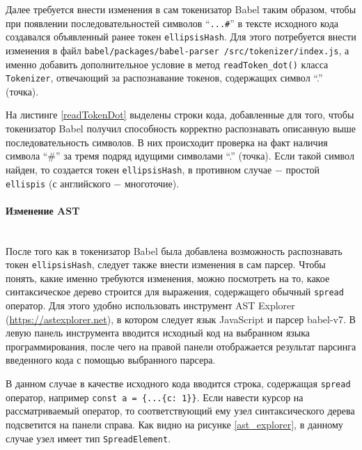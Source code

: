 \documentclass[14pt, a4paper]{article}
\def\code#1{\texttt{#1}} %
\begin{document}


Далее требуется внести изменения в сам токенизатор Babel таким образом, чтобы при появлении последовательностей символов 
``\code{...\#}'' в тексте исходного кода создавался объявленный ранее токен \code{ellipsisHash}. Для этого 
потребуется внести изменения в файл \code{babel/packages/babel-parser
/src/tokenizer/index.js}, а именно добавить дополнительное условие в метод \code{readToken\_dot()} класса \code{Tokenizer}, отвечающий за распознавание токенов,
содержащих символ ``.'' (точка).


На листинге \ref{readTokenDot} выделены строки кода, добавленные для того, чтобы токенизатор Babel 
получил способность корректно распознавать описанную выше последовательность символов. В них происходит 
проверка на факт наличия символа ``\#'' за тремя подряд идущими символами ``.'' (точка).
Если такой символ найден, то создается токен \code{ellipsisHash}, в противном случае
$-$ простой \code{ellispis} (с английского $-$ многоточие).

\paragraph{Изменение AST} \mbox{}\\

После того как в токенизатор Babel была добавлена возможность распознавать токен \code{ellipsisHash},
следует также внести изменения в сам парсер. Чтобы понять, какие именно требуются изменения, можно посмотреть на то, какое
синтаксическое дерево строится для выражения, содержащего обычный \code{spread} оператор. Для этого удобно использовать 
инструмент AST Explorer (\url{https://astexplorer.net}), в котором следует язык JavaScript и парсер babel-v7.
В левую панель инструмента вводится исходный код на выбранном языка программирования, после чего на 
правой панели отображается результат парсинга введенного кода с помощью выбранного парсера.

В данном случае в качестве исходного кода вводится строка, содержащая \code{spread} оператор, например
\code{const a = \{...\{c: 1\}\}}. Если навести курсор на рассматриваемый оператор, то соответствующий 
ему узел синтаксического дерева подсветится на панели справа. Как видно на рисунке \ref{ast_explorer},
в данному случае узел имеет тип \code{SpreadElement}.
\end{document}
